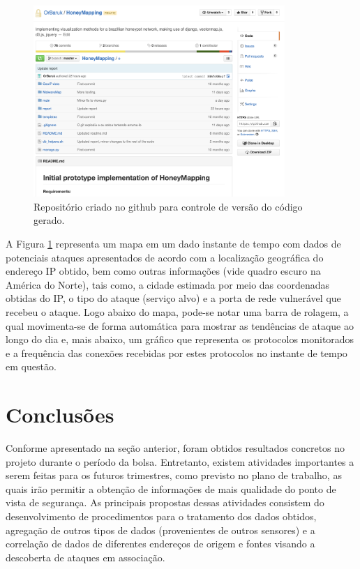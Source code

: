 \documentclass[Portuguese]
{ic-tese-v2}
\begin{document}
\begin{figure}
\center
\includegraphics[width=0.85\textwidth]{figs/git.png}
\caption{Repositório criado no github para controle de versão do código gerado.}
\label{mapa}
\end{figure}


A Figura \ref{mapa} representa um mapa em um dado instante de tempo com dados de potenciais ataques apresentados de acordo com a localização geográfica do endereço IP obtido, bem como outras informações (vide quadro escuro na América do Norte), tais como, a cidade estimada por meio das coordenadas obtidas do IP, o tipo do ataque (serviço alvo) e a porta de rede vulnerável que recebeu o ataque. Logo abaixo do mapa, pode-se notar uma barra de rolagem, a qual movimenta-se de forma automática para mostrar as tendências de ataque ao longo do dia e, mais abaixo, um gráfico que representa os protocolos monitorados e a frequência das conexões recebidas por estes protocolos no instante de tempo em questão.


\chapter{Conclusões}
Conforme apresentado na seção anterior, foram obtidos resultados concretos no projeto durante o período da bolsa. Entretanto, existem atividades importantes a serem feitas para os futuros trimestres, como previsto no plano de trabalho, as quais irão permitir a obtenção de informações de mais qualidade do ponto de vista de segurança. As principais propostas dessas atividades consistem do desenvolvimento de procedimentos para o tratamento dos dados obtidos, agregação de outros tipos de dados (provenientes de outros sensores) e a correlação de dados de diferentes endereços de origem e fontes visando a descoberta de ataques em associação.
\end{document}

